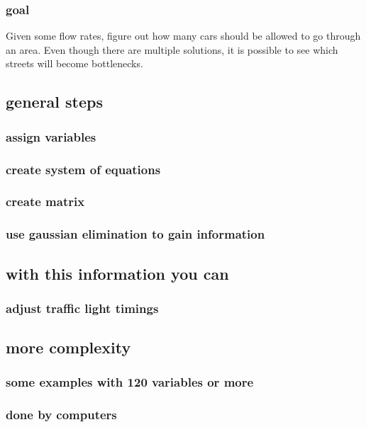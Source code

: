 \documentclass[letterpaper]{article}
\begin{document}
\subsubsection{goal}
\label{sec:orgd8715e0}
Given some flow rates, figure out how many cars should be allowed to go through an area.
Even though there are multiple solutions, it is possible to see which streets will become bottlenecks.
\subsection{general steps}
\label{sec:org08f6436}
\subsubsection{assign variables}
\label{sec:org724752d}
\subsubsection{create system of equations}
\label{sec:orgbfc7608}
\subsubsection{create matrix}
\label{sec:org003d4d1}
\subsubsection{use gaussian elimination to gain information}
\label{sec:orgad8bfc8}
\subsection{with this information you can}
\label{sec:org11f1a64}
\subsubsection{adjust traffic light timings}
\label{sec:orge77e7d1}
\subsection{more complexity}
\label{sec:org69e0635}
\subsubsection{some examples with 120 variables or more}
\label{sec:org1f83be0}
\subsubsection{done by computers}
\label{sec:org4cd5fd2}
\end{document}
